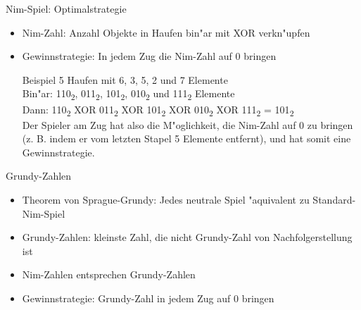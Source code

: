 \documentclass[18pt]{beamer}
\begin{document}
\begin{frame}{Nim-Spiel: Optimalstrategie}
\begin{itemize}
\item Nim-Zahl: Anzahl Objekte in Haufen bin"ar mit XOR verkn"upfen
\item Gewinnstrategie: In jedem Zug die Nim-Zahl auf 0 bringen
\begin{block}{Beispiel}
5 Haufen mit 6, 3, 5, 2 und 7 Elemente \\
Bin"ar: 110\textsubscript{2}, 011\textsubscript{2}, 101\textsubscript{2}, 010\textsubscript{2} und 111\textsubscript{2} Elemente\\
Dann: 110\textsubscript{2} XOR 011\textsubscript{2} XOR 101\textsubscript{2} XOR 010\textsubscript{2} XOR 111\textsubscript{2} = 101\textsubscript{2} \\
Der Spieler am Zug hat also die M"oglichkeit, die Nim-Zahl auf 0 zu bringen (z. B. indem er vom letzten Stapel 5 Elemente entfernt), und hat somit eine Gewinnstrategie.
\end{block}
\end{itemize}
\end{frame}

\begin{frame}{Grundy-Zahlen}
\begin{itemize}
\item Theorem von Sprague-Grundy: Jedes neutrale Spiel "aquivalent zu Standard-Nim-Spiel
\item Grundy-Zahlen: kleinste Zahl, die nicht Grundy-Zahl von Nachfolgerstellung ist
\item Nim-Zahlen entsprechen Grundy-Zahlen
\item Gewinnstrategie: Grundy-Zahl in jedem Zug auf 0 bringen
\end{itemize}
\end{frame}
\end{document}
